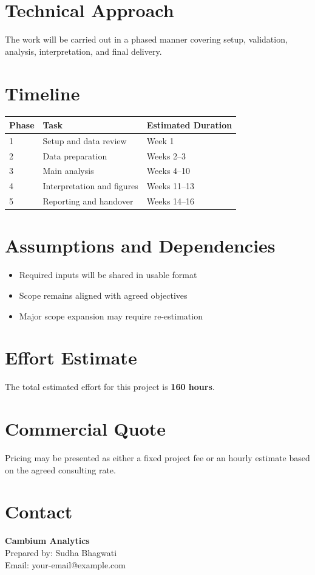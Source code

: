 \documentclass[11pt,a4paper]{article}
\newcommand{\PreparedBy}{Sudha Bhagwati}
\newcommand{\EstimatedHours}{160 hours}
\begin{document}
\section{Technical Approach}
The work will be carried out in a phased manner covering setup, validation, analysis, interpretation, and final delivery.

\section{Timeline}
\begin{tabularx}{\textwidth}{p{2cm}p{5cm}X}
\toprule
\textbf{Phase} & \textbf{Task} & \textbf{Estimated Duration} \\
\midrule
1 & Setup and data review & Week 1 \\
2 & Data preparation & Weeks 2--3 \\
3 & Main analysis & Weeks 4--10 \\
4 & Interpretation and figures & Weeks 11--13 \\
5 & Reporting and handover & Weeks 14--16 \\
\bottomrule
\end{tabularx}

\section{Assumptions and Dependencies}
\begin{itemize}[leftmargin=1.5em]
    \item Required inputs will be shared in usable format
    \item Scope remains aligned with agreed objectives
    \item Major scope expansion may require re-estimation
\end{itemize}

\section{Effort Estimate}
The total estimated effort for this project is \textbf{\EstimatedHours}.

\section{Commercial Quote}
Pricing may be presented as either a fixed project fee or an hourly estimate based on the agreed consulting rate.

\section{Contact}
\textbf{Cambium Analytics}\\
Prepared by: \PreparedBy\\
Email: your-email@example.com
\end{document}
